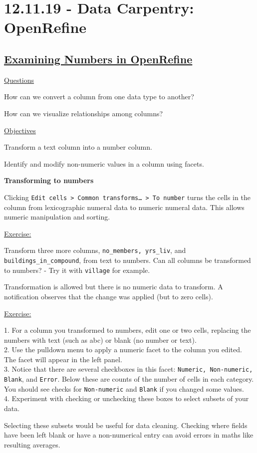 \documentclass[12pt]{article}
\begin{document}
\newpage\section{12.11.19 - Data Carpentry: OpenRefine}\subsection{\href{https://datacarpentry.org/openrefine-socialsci/04-numbers/index.html}{\textbf{Examining Numbers in OpenRefine}}}
\color{gray}
\underline{Questions}

How can we convert a column from one data type to another?

How can we visualize relationships among columns?

\underline{Objectives}

Transform a text column into a number column.

Identify and modify non-numeric values in a column using facets.

\color{black}
\vspace{0.7em}
\textbf{Transforming to numbers}

Clicking \texttt{Edit cells > Common transforms… > To number} turns the cells in the column from lexicographic numeral data to numeric numeral data. This allows numeric manipulation and sorting.

\vspace{0.5em}
\begin{addmargin}[1cm]{0cm}
\color{gray}
\underline{Exercise:}

Transform three more columns, \texttt{no\_members, yrs\_liv}, and \texttt{buildings\_in\_compound}, from text to numbers. Can all columns be transformed to numbers? - Try it with \texttt{village} for example.

\color{black}\vspace{0.5em}
Transformation is allowed but there is no numeric data to transform. A notification observes that the change was applied (but to zero cells).

\color{gray}
\underline{Exercise:}

1. For a column you transformed to numbers, edit one or two cells, replacing the numbers with text (such as abc) or blank (no number or text).
\\2. Use the pulldown menu to apply a numeric facet to the column you edited. The facet will appear in the left panel.
\\3. Notice that there are several checkboxes in this facet: \texttt{Numeric, Non-numeric, Blank}, and \texttt{Error}. Below these are counts of the number of cells in each category. You should see checks for \texttt{Non-numeric} and \texttt{Blank} if you changed some values.
\\4. Experiment with checking or unchecking these boxes to select subsets of your data.

\color{black}\vspace{1em}
Selecting these subsets would be useful for data cleaning. Checking where fields have been left blank or have a non-numerical entry can avoid errors in maths like resulting averages.
\end{addmargin}
\end{document}
